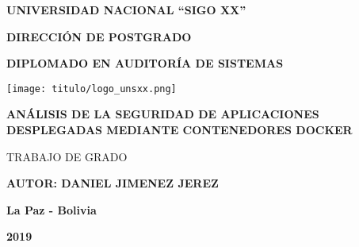 \documentclass[../main/main.tex]{subfiles}
\begin{document}
  \thispagestyle{empty}
  \vspace*{-0.5cm}

  \begin{center}
    \LARGE\MakeUppercase{\textbf{Universidad Nacional ``Sigo XX''}}

    \vspace{0.5cm}
    \Large\MakeUppercase{\textbf{Dirección de Postgrado}}

    \vspace{0.5cm}
    \large\MakeUppercase{\textbf{Diplomado en Auditoría de Sistemas}}

    \vspace{1.3cm}
    \texttt{[image: titulo/logo\_unsxx.png]}
    \vspace{1.3cm}

    \Large\MakeUppercase{\textbf{Análisis de la seguridad de aplicaciones desplegadas mediante contenedores Docker}}

    \vspace{0.4cm}
    \large\MakeUppercase{Trabajo de Grado}

    \vspace{1cm}
    \large{\MakeUppercase{\textbf{Autor: Daniel Jimenez Jerez}}}
    \vspace{1cm}

    \large{\textbf{La Paz - Bolivia}}

    \large{\textbf{2019}}
  \end{center}
\end{document}
